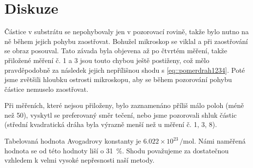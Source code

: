 \section*{Diskuze}
Částice v substrátu se nepohybovaly jen v pozorovací rovině, takže bylo nutno na ně během jejich pohybu zaostřovat.
Bohužel mikroskop se viklal a při zaostřování se obraz posouval.
Tato závada byla objevena až po čtvrtém měření, takže přiložené měření č. 1 a 3 jsou touto chybou ještě postiženy, což mělo pravděpodobně za následek jejich nepřílišnou shodu s \eqref{eq::pomerdrah1234}.
Poté jsme zvětšili hloubku ostrosti mikroskopu, aby se během pozorování pohybu částice nemuselo zaostřovat.

Při měřeních, které nejsou přiloženy, bylo zaznamenáno příliš málo poloh (méně než 50), vyskytl se preferovaný směr tečení, nebo jsme pozorovali shluk částic (střední kvadratická dráha byla výrazně menší než u měření č. 1, 3, 8).

Tabelovaná hodnota Avogadrovy konstanty \cite{avogadro} je $\num{6.022}\times 10^{23}\,\si{\per\mole}$.
Námi naměřená hodnota se od této hodnoty liší o \SI{31}{\percent}.
Shodu považujeme za dostatečnou vzhledem k velmi vysoké nepřesnosti naší metody.